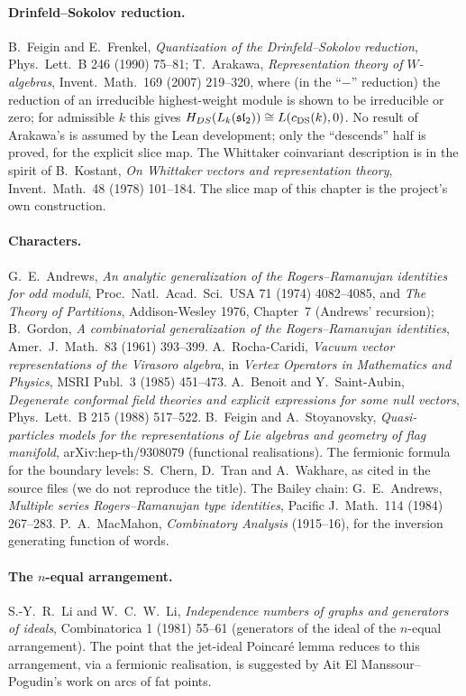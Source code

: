\paragraph{Drinfeld--Sokolov reduction.} B.~Feigin and E.~Frenkel, \emph{Quantization of the Drinfeld--Sokolov
reduction}, Phys.\ Lett.\ B 246 (1990) 75--81; T.~Arakawa, \emph{Representation theory of $W$-algebras}, Invent.\ Math.\
169 (2007) 219--320, where (in the ``$-$'' reduction) the reduction of an irreducible highest-weight module is shown to be
irreducible or zero; for admissible $k$ this gives $H_{DS}(L_k(\mathfrak{sl}_2))\cong L(c_{\mathrm{DS}}(k),0)$. No result of
Arakawa's is assumed by the Lean development; only the ``descends'' half is proved, for the explicit slice map. The Whittaker coinvariant description is in the spirit of
B.~Kostant, \emph{On Whittaker vectors and representation theory}, Invent.\ Math.\ 48 (1978) 101--184. The slice map of this
chapter is the project's own construction.

\paragraph{Characters.} G.~E.~Andrews, \emph{An analytic generalization of the Rogers--Ramanujan identities for odd
moduli}, Proc.\ Natl.\ Acad.\ Sci.\ USA 71 (1974) 4082--4085, and \emph{The Theory of Partitions}, Addison-Wesley 1976,
Chapter~7 (Andrews' recursion); B.~Gordon, \emph{A combinatorial generalization of the Rogers--Ramanujan identities},
Amer.\ J.\ Math.\ 83 (1961) 393--399. A.~Rocha-Caridi, \emph{Vacuum vector representations of the Virasoro algebra}, in
\emph{Vertex Operators in Mathematics and Physics}, MSRI Publ.\ 3 (1985) 451--473. A.~Benoit and Y.~Saint-Aubin, \emph{Degenerate
conformal field theories and explicit expressions for some null vectors}, Phys.\ Lett.\ B 215 (1988) 517--522. B.~Feigin and
A.~Stoyanovsky, \emph{Quasi-particles models for the representations of Lie algebras and geometry of flag manifold},
arXiv:hep-th/9308079 (functional realisations). The fermionic formula for the boundary levels: S.~Chern, D.~Tran and A.~Wakhare,
as cited in the source files (we do not reproduce the title). The Bailey chain: G.~E.~Andrews, \emph{Multiple series
Rogers--Ramanujan type identities}, Pacific J.\ Math.\ 114 (1984) 267--283. P.~A.~MacMahon, \emph{Combinatory Analysis}
(1915--16), for the inversion generating function of words.

\paragraph{The $n$-equal arrangement.} S.-Y.~R.~Li and W.~C.~W.~Li, \emph{Independence numbers of graphs and generators of
ideals}, Combinatorica 1 (1981) 55--61 (generators of the ideal of the $n$-equal arrangement). The point that the jet-ideal
Poincar\'e lemma reduces to this arrangement, via a fermionic realisation, is suggested by Ait El Manssour--Pogudin's work on
arcs of fat points.

\endgroup
